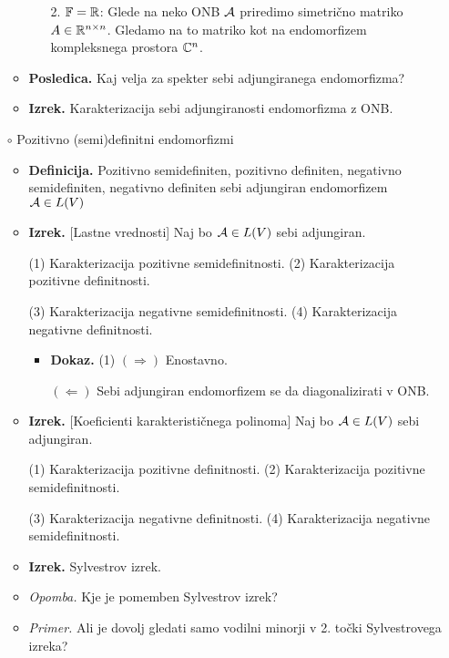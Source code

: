 \begin{enumerate}
\begin{itemize}
\begin{itemize}
            2. $\mathbb{F} = \mathbb{R}$: Glede na neko ONB $\mathcal{A}$ priredimo simetrično matriko $A \in \mathbb{R}^{n \times n}$. Gledamo na to matriko kot na endomorfizem kompleksnega prostora $\mathbb{C}^n$.
        \end{itemize}
        \item \colorbox{orange!30}{\textbf{Posledica.}} Kaj velja za spekter sebi adjungiranega endomorfizma?
        \item \colorbox{blue!30}{\textbf{Izrek.}} Karakterizacija sebi adjungiranosti endomorfizma z ONB.
    \end{itemize}

    \item[$\circ$] Pozitivno (semi)definitni endomorfizmi
    \begin{itemize}
        \item \colorbox{purple!30}{\textbf{Definicija.}} Pozitivno semidefiniten, pozitivno definiten, negativno semidefiniten, negativno definiten sebi adjungiran endomorfizem $\mathcal{A} \in L(V)$
        \item \colorbox{blue!30}{\textbf{Izrek.}} [Lastne vrednosti] Naj bo $\mathcal{A} \in L(V)$ sebi adjungiran.
        
        (1) Karakterizacija pozitivne semidefinitnosti.
        (2) Karakterizacija pozitivne definitnosti.

        (3) Karakterizacija negativne semidefinitnosti.
        (4) Karakterizacija negativne definitnosti.
        \begin{itemize}
            \item \colorbox{green!30}{\textbf{Dokaz.}} (1) $(\Rightarrow)$ Enostavno.
            
            $(\Leftarrow)$ Sebi adjungiran endomorfizem se da diagonalizirati v ONB.
        \end{itemize}
        \item \colorbox{blue!30}{\textbf{Izrek.}} [Koeficienti karakterističnega polinoma] Naj bo $\mathcal{A} \in L(V)$ sebi adjungiran.
        
        (1) Karakterizacija pozitivne definitnosti.
        (2) Karakterizacija pozitivne semidefinitnosti.

        (3) Karakterizacija negativne definitnosti.
        (4) Karakterizacija negativne semidefinitnosti.
        \item \colorbox{blue!30}{\textbf{Izrek.}} Sylvestrov izrek.
        \item \colorbox{yellow!30}{\emph{Opomba.}} Kje je pomemben Sylvestrov izrek?
        \item \colorbox{yellow!30}{\emph{Primer.}} Ali je dovolj gledati samo vodilni minorji v 2. točki Sylvestrovega izreka? 
    \end{itemize}


\end{enumerate}
